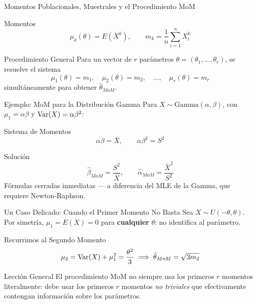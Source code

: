 \documentclass[10pt, aspectratio=169]{beamer}
\begin{document}
\begin{frame}{Momentos Poblacionales, Muestrales y el Procedimiento MoM}
  \footnotesize
  \begin{block}{Momentos}
    $$\mu_k(\theta) = E(X^k), \qquad m_k = \frac{1}{n}\sum_{i=1}^n X_i^k$$
  \end{block}
  \pause

  \vspace{0.1cm}
  \begin{alertblock}{Procedimiento General}
    Para un vector de $r$ parámetros $\theta=(\theta_1,\ldots,\theta_r)$, se resuelve el sistema
    $$\mu_1(\theta) = m_1, \quad \mu_2(\theta) = m_2, \quad \ldots, \quad \mu_r(\theta) = m_r$$
    simultáneamente para obtener $\hat\theta_{MoM}$.
  \end{alertblock}
\end{frame}

\begin{frame}{Ejemplo: MoM para la Distribución Gamma}
  \footnotesize
  Para $X\sim\text{Gamma}(\alpha,\beta)$, con $\mu_1=\alpha\beta$ y $\operatorname{Var}(X)=\alpha\beta^2$: \pause

  \vspace{0.1cm}
  \begin{block}{Sistema de Momentos}
    $$\alpha\beta = \bar X, \qquad \alpha\beta^2 = S^2$$
  \end{block}

  \vspace{0.1cm}
  \pause
  \begin{alertblock}{Solución}
    $$\hat\beta_{MoM} = \frac{S^2}{\bar X}, \qquad \hat\alpha_{MoM} = \frac{\bar X^2}{S^2}$$
    Fórmulas cerradas inmediatas --- a diferencia del MLE de la Gamma, que requiere Newton-Raphson.
  \end{alertblock}
\end{frame}

\begin{frame}{Un Caso Delicado: Cuando el Primer Momento No Basta}
  \footnotesize
  Sea $X\sim U(-\theta,\theta)$. Por simetría, $\mu_1=E(X)=0$ para \textbf{cualquier} $\theta$: no identifica al parámetro. \pause

  \vspace{0.1cm}
  \begin{block}{Recurrimos al Segundo Momento}
    $$\mu_2 = \operatorname{Var}(X)+\mu_1^2 = \frac{\theta^2}{3} \implies \hat\theta_{MoM} = \sqrt{3m_2}$$
  \end{block}

  \vspace{0.1cm}
  \pause
  \begin{alertblock}{Lección General}
    El procedimiento MoM no siempre usa los primeros $r$ momentos literalmente: debe usar los primeros $r$ momentos \emph{no triviales} que efectivamente contengan información sobre los parámetros.
  \end{alertblock}
\end{frame}
\end{document}
